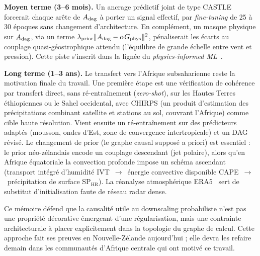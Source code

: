 \textbf{Moyen terme (3--6 mois).} Un ancrage prédictif joint de type CASTLE~\cite{kyono_castle_2020} forcerait chaque arête de $A_{\mathrm{dag}}$ à porter un signal effectif, par \emph{fine-tuning} de 25 à 30 époques sans changement d'architecture. En complément, un masque physique sur $A_{\mathrm{dag}}$, via un terme $\lambda_{\mathrm{prior}} \Vert A_{\mathrm{dag}} - \alpha G_{\mathrm{phys}} \Vert^2$, pénaliserait les écarts au couplage quasi-géostrophique attendu (l'équilibre de grande échelle entre vent et pression). Cette piste s'inscrit dans la lignée du \emph{physics-informed ML}~\cite{karniadakis_pinn_2021}.

\textbf{Long terme (1--3 ans).} Le transfert vers l'Afrique subsaharienne reste la motivation finale du travail. Une première étape est une vérification de cohérence par transfert direct, sans ré-entraînement (\emph{zero-shot}), sur les Hautes Terres éthiopiennes ou le Sahel occidental, avec CHIRPS (un produit d'estimation des précipitations combinant satellite et stations au sol, couvrant l'Afrique) comme cible haute résolution. Vient ensuite un ré-entraînement sur des prédicteurs adaptés (mousson, ondes d'Est, zone de convergence intertropicale) et un DAG révisé. Le changement de prior (le graphe causal supposé a priori) est essentiel : le prior néo-zélandais encode un couplage descendant (jet polaire), alors qu'en Afrique équatoriale la convection profonde impose un schéma ascendant (transport intégré d'humidité IVT~$\to$~énergie convective disponible CAPE~$\to$~précipitation de surface SP$_{\mathrm{HR}}$). La réanalyse atmosphérique ERA5~\cite{hersbach_era5_2020} sert de substitut d'initialisation faute de réseau radar dense.

Ce mémoire défend que la causalité utile au downscaling probabiliste n'est pas une propriété décorative émergeant d'une régularisation, mais une contrainte architecturale à placer explicitement dans la topologie du graphe de calcul. Cette approche fait ses preuves en Nouvelle-Zélande aujourd'hui ; elle devra les refaire demain dans les communautés d'Afrique centrale qui ont motivé ce travail.